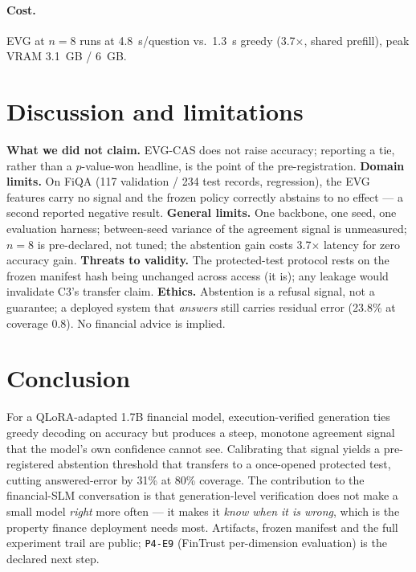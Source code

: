 \documentclass[10pt]{article}
\begin{document}
\paragraph{Cost.} EVG at $n=8$ runs at 4.8~s/question vs.\ 1.3~s greedy (3.7$\times$,
shared prefill), peak VRAM 3.1~GB / 6~GB.

\section{Discussion and limitations}
\textbf{What we did not claim.} EVG-CAS does not raise accuracy; reporting a tie, rather
than a $p$-value-won headline, is the point of the pre-registration. \textbf{Domain limits.}
On FiQA (117 validation / 234 test records, regression), the EVG features carry no signal
and the frozen policy correctly abstains to no effect --- a second reported negative result.
\textbf{General limits.} One backbone, one seed, one evaluation harness; between-seed
variance of the agreement signal is unmeasured; $n{=}8$ is pre-declared, not tuned; the
abstention gain costs 3.7$\times$ latency for zero accuracy gain. \textbf{Threats to
validity.} The protected-test protocol rests on the frozen manifest hash being unchanged
across access (it is); any leakage would invalidate C3's transfer claim. \textbf{Ethics.}
Abstention is a refusal signal, not a guarantee; a deployed system that \emph{answers} still
carries residual error (23.8\% at coverage 0.8). No financial advice is implied.

\section{Conclusion}
For a QLoRA-adapted 1.7B financial model, execution-verified generation ties greedy decoding
on accuracy but produces a steep, monotone agreement signal that the model's own confidence
cannot see. Calibrating that signal yields a pre-registered abstention threshold that
transfers to a once-opened protected test, cutting answered-error by 31\% at 80\% coverage.
The contribution to the financial-SLM conversation is that generation-level verification
does not make a small model \emph{right} more often --- it makes it \emph{know when it is wrong},
which is the property finance deployment needs most. Artifacts, frozen manifest and the full
experiment trail are public; \texttt{P4-E9} (FinTrust per-dimension evaluation) is the
declared next step.
\end{document}
